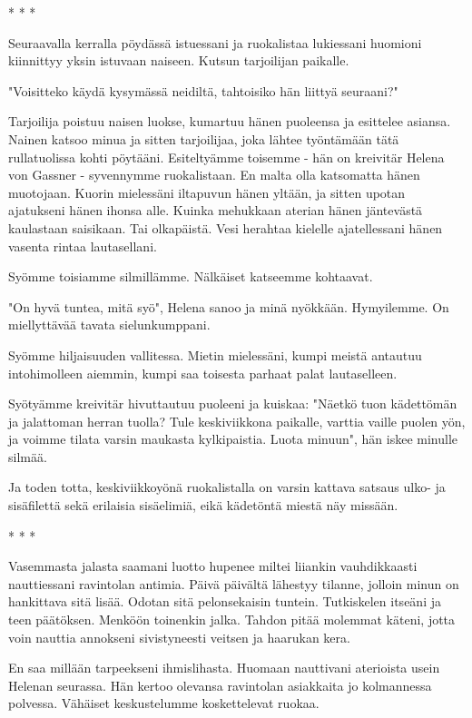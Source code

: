 * * *

Seuraavalla kerralla pöydässä istuessani ja ruokalistaa lukiessani huomioni kiinnittyy yksin istuvaan naiseen. Kutsun tarjoilijan paikalle.


"Voisitteko käydä kysymässä neidiltä, tahtoisiko hän liittyä seuraani?"


Tarjoilija poistuu naisen luokse, kumartuu hänen puoleensa ja esittelee asiansa. Nainen katsoo minua ja sitten tarjoilijaa, joka lähtee työntämään tätä rullatuolissa kohti pöytääni. Esiteltyämme toisemme - hän on kreivitär Helena von Gassner - syvennymme ruokalistaan. En malta olla katsomatta hänen muotojaan. Kuorin mielessäni iltapuvun hänen yltään, ja sitten upotan ajatukseni hänen ihonsa alle. Kuinka mehukkaan aterian hänen jäntevästä kaulastaan saisikaan. Tai olkapäistä. Vesi herahtaa kielelle ajatellessani hänen vasenta rintaa lautasellani.


Syömme toisiamme silmillämme. Nälkäiset katseemme kohtaavat.


"On hyvä tuntea, mitä syö", Helena sanoo ja minä nyökkään. Hymyilemme. On miellyttävää tavata sielunkumppani.


Syömme hiljaisuuden vallitessa. Mietin mielessäni, kumpi meistä antautuu intohimolleen aiemmin, kumpi saa toisesta parhaat palat lautaselleen.


Syötyämme kreivitär hivuttautuu puoleeni ja kuiskaa: "Näetkö tuon kädettömän ja jalattoman herran tuolla? Tule keskiviikkona paikalle, varttia vaille puolen yön, ja voimme tilata varsin maukasta kylkipaistia. Luota minuun", hän iskee minulle silmää.


Ja toden totta, keskiviikkoyönä ruokalistalla on varsin kattava satsaus ulko- ja sisäfilettä sekä erilaisia sisäelimiä, eikä kädetöntä miestä näy missään.






* * *

Vasemmasta jalasta saamani luotto hupenee miltei liiankin vauhdikkaasti nauttiessani ravintolan antimia. Päivä päivältä lähestyy tilanne, jolloin minun on hankittava sitä lisää. Odotan sitä pelonsekaisin tuntein. Tutkiskelen itseäni ja teen päätöksen. Menköön toinenkin jalka. Tahdon pitää molemmat käteni, jotta voin nauttia annokseni sivistyneesti veitsen ja haarukan kera.


En saa millään tarpeekseni ihmislihasta. Huomaan nauttivani aterioista usein Helenan seurassa. Hän kertoo olevansa ravintolan asiakkaita jo kolmannessa polvessa. Vähäiset keskustelumme koskettelevat ruokaa.



